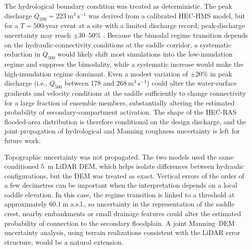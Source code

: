 \documentclass[a4paper,fleqn]{cas-sc}
\newcommand{\hecras}{\textsc{HEC-RAS}}
\begin{document}
The hydrological boundary condition was treated as deterministic. The peak discharge $Q_{500}=223~\mathrm{m^3\,s^{-1}}$ was derived from a calibrated HEC-HMS model, but for a $T=500$-year event at a site with a limited discharge record, peak-discharge uncertainty may reach $\pm30$--50\% \citep{merz2005}. Because the bimodal regime transition depends on the hydraulic-connectivity conditions at the saddle corridor, a systematic reduction in $Q_{500}$ would likely shift most simulations into the low-inundation regime and suppress the bimodality, while a systematic increase would make the high-inundation regime dominant. Even a modest variation of $\pm20\%$ in peak discharge (i.e., $Q_{500}$ between 178 and $268~\mathrm{m^3\,s^{-1}}$) could alter the water-surface gradients and velocity conditions at the saddle sufficiently to change connectivity for a large fraction of ensemble members, substantially altering the estimated probability of secondary-compartment activation. The shape of the \hecras{} flooded-area distribution is therefore conditional on the design discharge, and the joint propagation of hydrological and Manning roughness uncertainty is left for future work.


Topographic uncertainty was not propagated. The two models used the same conditioned 5~m LiDAR DEM, which helps isolate differences between hydraulic configurations, but the DEM was treated as exact. Vertical errors of the order of a few decimetres can be important when the interpretation depends on a local saddle elevation. In this case, the regime transition is linked to a threshold at approximately $60.1~\mathrm{m}$ a.s.l., so uncertainty in the representation of the saddle crest, nearby embankments or small drainage features could alter the estimated probability of connection to the secondary floodplain. A joint Manning--DEM uncertainty analysis, using terrain realizations consistent with the LiDAR error structure, would be a natural extension.
\end{document}
